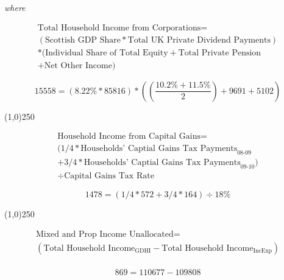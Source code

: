 \begin{enumerate}
\textit{where}

\begin{equation} 
\begin{split}
\text{Total Household Income from Corporations} = \\ 
(\text{Scottish GDP Share}*\text{Total UK Private Dividend Payments})\\
*(\text{Individual Share of Total Equity} + \text{Total Private Pension}\\
 + \text{Net Other Income})
\end{split} \label{eq:2.5.5}
\end{equation} 

\begin{equation} \nonumber
15558 = (8.22\% * 85816)*((\frac{10.2\%+11.5\%}{2})+9691+5102)
\end{equation}

\begin{center}
\line(1,0){250}
\end{center}


\begin{equation} 
\begin{split}
\text{Household Income from Capital Gains} = \\ 
(1/4 *\text{Households' Captial Gains Tax Payments}_\text{08-09}\\
+ 3/4 *\text{Households' Captial Gains Tax Payments}_\text{09-10})\\
\div \text{Capital Gains Tax Rate}
\end{split} \label{eq:2.5.6}
\end{equation} 

\begin{equation} \nonumber
1478 = (1/4*572+3/4*164)\div 18\%
\end{equation}

\begin{center}
\line(1,0){250}
\end{center}


\begin{equation} 
\begin{split}
\text{Mixed and Prop Income Unallocated} = \\ 
(\text{Total Household Income}_\text{GDHI}-\text{Total Household Income}_\text{IncExp})\\
\end{split} \label{eq:2.5.7}
\end{equation} 

\begin{equation} \nonumber
869 = 110677-109808
\end{equation}\\


\end{enumerate}
